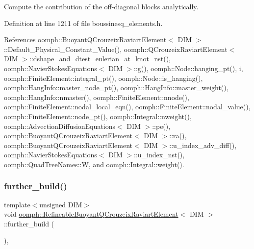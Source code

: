 Compute the contribution of the off-\/diagonal blocks analytically. 



Definition at line 1211 of file boussinesq\+\_\+elements.\+h.



References oomph\+::\+Buoyant\+Q\+Crouzeix\+Raviart\+Element$<$ D\+I\+M $>$\+::\+Default\+\_\+\+Physical\+\_\+\+Constant\+\_\+\+Value(), oomph\+::\+Q\+Crouzeix\+Raviart\+Element$<$ D\+I\+M $>$\+::dshape\+\_\+and\+\_\+dtest\+\_\+eulerian\+\_\+at\+\_\+knot\+\_\+nst(), oomph\+::\+Navier\+Stokes\+Equations$<$ D\+I\+M $>$\+::g(), oomph\+::\+Node\+::hanging\+\_\+pt(), i, oomph\+::\+Finite\+Element\+::integral\+\_\+pt(), oomph\+::\+Node\+::is\+\_\+hanging(), oomph\+::\+Hang\+Info\+::master\+\_\+node\+\_\+pt(), oomph\+::\+Hang\+Info\+::master\+\_\+weight(), oomph\+::\+Hang\+Info\+::nmaster(), oomph\+::\+Finite\+Element\+::nnode(), oomph\+::\+Finite\+Element\+::nodal\+\_\+local\+\_\+eqn(), oomph\+::\+Finite\+Element\+::nodal\+\_\+value(), oomph\+::\+Finite\+Element\+::node\+\_\+pt(), oomph\+::\+Integral\+::nweight(), oomph\+::\+Advection\+Diffusion\+Equations$<$ D\+I\+M $>$\+::pe(), oomph\+::\+Buoyant\+Q\+Crouzeix\+Raviart\+Element$<$ D\+I\+M $>$\+::ra(), oomph\+::\+Buoyant\+Q\+Crouzeix\+Raviart\+Element$<$ D\+I\+M $>$\+::u\+\_\+index\+\_\+adv\+\_\+diff(), oomph\+::\+Navier\+Stokes\+Equations$<$ D\+I\+M $>$\+::u\+\_\+index\+\_\+nst(), oomph\+::\+Quad\+Tree\+Names\+::W, and oomph\+::\+Integral\+::weight().

\mbox{\label{classoomph_1_1RefineableBuoyantQCrouzeixRaviartElement_a60d622f02595901b5f3ad830de915471}} 
\subsubsection{\texorpdfstring{further\+\_\+build()}{further\_build()}}
{\footnotesize\ttfamily template$<$unsigned D\+IM$>$ \\
void \hyperlink{classoomph_1_1RefineableBuoyantQCrouzeixRaviartElement}{oomph\+::\+Refineable\+Buoyant\+Q\+Crouzeix\+Raviart\+Element}$<$ D\+IM $>$\+::further\+\_\+build (\begin{DoxyParamCaption}{ }\end{DoxyParamCaption})\hspace{0.3cm}{\ttfamily [inline]}, {\ttfamily [virtual]}}



